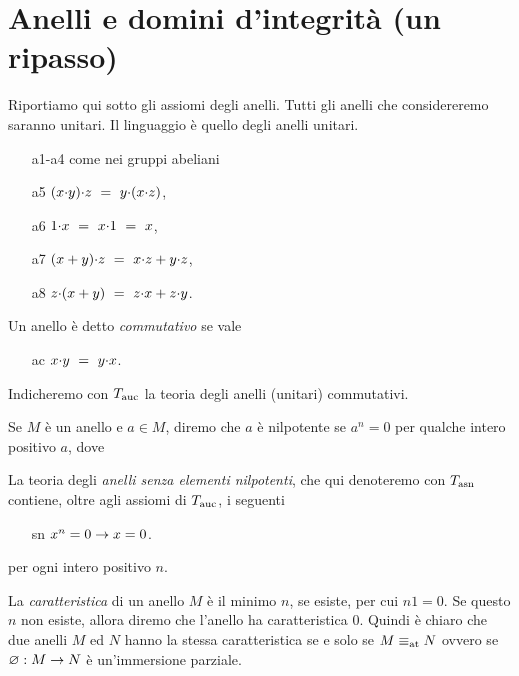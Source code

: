 \section{Anelli e domini d'integrit\`a (un ripasso)}
\label{anelli}
Riportiamo qui sotto gli assiomi degli anelli. Tutti gli anelli che considereremo saranno unitari. Il linguaggio \`e quello degli anelli unitari. 

\begin{itemize}
\item[a1-a4] come nei gruppi abeliani
\item[a5] $(x\mathord\cdot y)\mathord\cdot z\  =\ y\mathord\cdot(x\mathord\cdot z)$,
\item[a6] $1\mathord\cdot x\ =\ x\mathord\cdot 1\ =\ x$,
\item[a7] $(x+y)\mathord\cdot z\ =\ x\mathord\cdot z + y\mathord\cdot z$,
\item[a8] $z\mathord\cdot (x+y)\ =\ z\mathord\cdot x + z\mathord\cdot y$.
\end{itemize}

Un anello \`e detto \emph{commutativo\/} se vale

\begin{itemize}
\item[ac] $x\mathord\cdot y\ =\ y\mathord\cdot x$.
\end{itemize}
 
Indicheremo con \emph{$T_{\rm auc}$} la teoria degli anelli (unitari) commutativi.

Se $M$ \`e un anello e $a\in M$, diremo che $a$ \`e nilpotente se $a^n=0$ per qualche intero positivo $a$, dove 


La teoria degli \emph{anelli senza elementi nilpotenti}, che qui denoteremo con \emph{$T_{\rm asn}$} contiene, oltre agli assiomi di $T_{\rm auc}$, i seguenti

\begin{itemize}
\item[sn] $x^n=0\rightarrow x=0$.
\end{itemize}

per ogni intero positivo $n$.

La \emph{caratteristica\/} di un anello $M$ \`e il minimo $n$, se esiste, per cui $n1=0$. Se questo $n$ non esiste, allora diremo che l'anello ha caratteristica $0$. Quindi \`e chiaro che due anelli $M$ ed $N$  hanno la stessa caratteristica se e solo se $M\equiv_{\rm at}N$ ovvero se $\varnothing:M\rightarrow N$ \`e un'immersione parziale.

